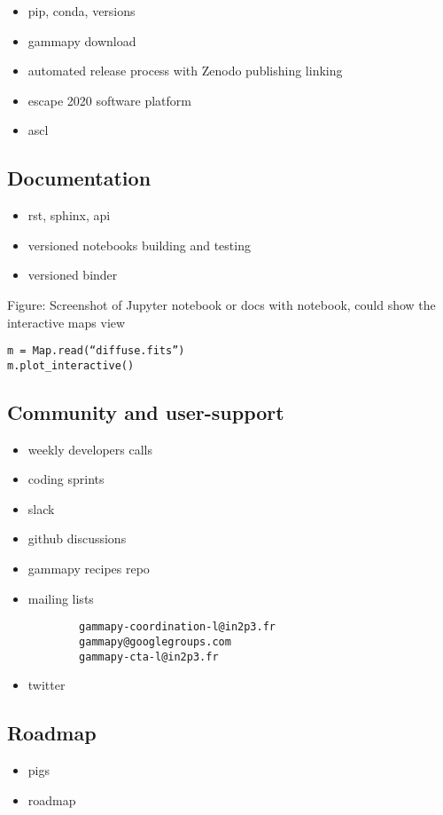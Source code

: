 \begin{itemize}
	\item pip, conda, versions
	\item gammapy download
	\item automated release process with Zenodo publishing linking
	\item escape 2020 software platform
	\item ascl
\end{itemize}

\subsection{Documentation}
\label{ssec:documentation}

\begin{itemize}
	\item rst, sphinx, api
	\item versioned notebooks building and testing
	\item versioned binder
\end{itemize}

Figure: Screenshot of Jupyter notebook or docs with notebook, could show the interactive maps view
\begin{verbatim}
m = Map.read(“diffuse.fits”)
m.plot_interactive()
\end{verbatim}


\subsection{Community and user-support}
\label{ssec:community-and-user-support}

\begin{itemize}
	\item weekly developers calls
	\item coding sprints 
	\item slack
	\item github discussions
	\item gammapy recipes repo
	\item mailing lists 
		\begin{verbatim}
		gammapy-coordination-l@in2p3.fr 
		gammapy@googlegroups.com 
		gammapy-cta-l@in2p3.fr
		\end{verbatim}
	\item twitter
\end{itemize}

\subsection{Roadmap}
\label{ssec:roadmap}

\begin{itemize}
	\item pigs
	\item roadmap
\end{itemize}
